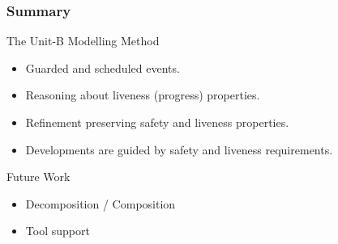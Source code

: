 
\begin{frame}
  \frametitle{Summary}
  
  \begin{alertblock}{The Unit-B Modelling Method}
    \begin{itemize}
    \item Guarded and \alert{scheduled} events.  \medskip
    \item Reasoning about \alert{liveness (progress) properties}.
      \medskip
    \item \alert{Refinement} preserving safety and liveness
      properties.  \medskip
    \item Developments are \alert{guided by safety and liveness
        requirements}.
    \end{itemize}
  \end{alertblock}
  

  \begin{block}{Future Work}
    \begin{itemize}
    \item Decomposition / Composition
      \medskip
    \item Tool support
    \end{itemize}    
  \end{block}
\end{frame}

  
    
    
    
    

